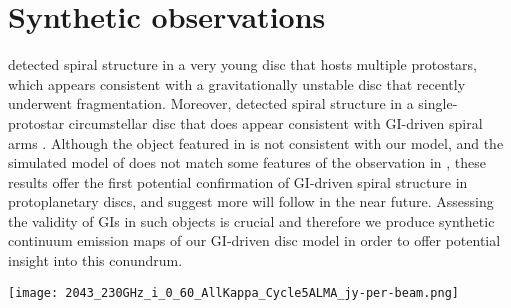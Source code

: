 \documentclass[fleqn,usenatbib]{mnras}
\newcommand{\alma}{ALMA}
\begin{document}
\section{Synthetic observations}
\label{sec:obs}

\citet{Tobin&Kratter2016} detected spiral structure in a very young disc that hosts multiple protostars, which appears consistent with a gravitationally unstable disc that recently underwent fragmentation. Moreover, \citet{Perez&Carpenter2016} detected spiral structure in a single-protostar circumstellar disc that does appear consistent with GI-driven spiral arms \citep{Tomida&Machida2017}. Although the object featured in \citet{Tobin&Kratter2016} is not consistent with our model, and the simulated model of \citet{Tomida&Machida2017} does not match some features of the observation in \citet{Perez&Carpenter2016}, these results offer the first potential confirmation of GI-driven spiral structure in protoplanetary discs, and suggest more will follow in the near future. Assessing the validity of GIs in such objects is crucial and therefore we produce synthetic continuum emission maps of our GI-driven disc model in order to offer potential insight into this conundrum.

\begin{figure*}
    \texttt{[image: 2043\_230GHz\_i\_0\_60\_AllKappa\_Cycle5ALMA\_jy-per-beam.png]}
    \caption{Continuum emission images of our disc model at 230\,GHz for three different dust opacity models and two different inclinations, synthesised using the \alma\ Cycle 5 antenna configuration. The white ellipse in the lower left indicates the size of the beam, which is 0.019$\,\times\,$0.017\,arcsec and is constant across all panels. The noise is approximately 15\,\textmu Jy per beam across the parameter space.}
    \label{fig:230GHzCycle5}
\end{figure*}
\end{document}
